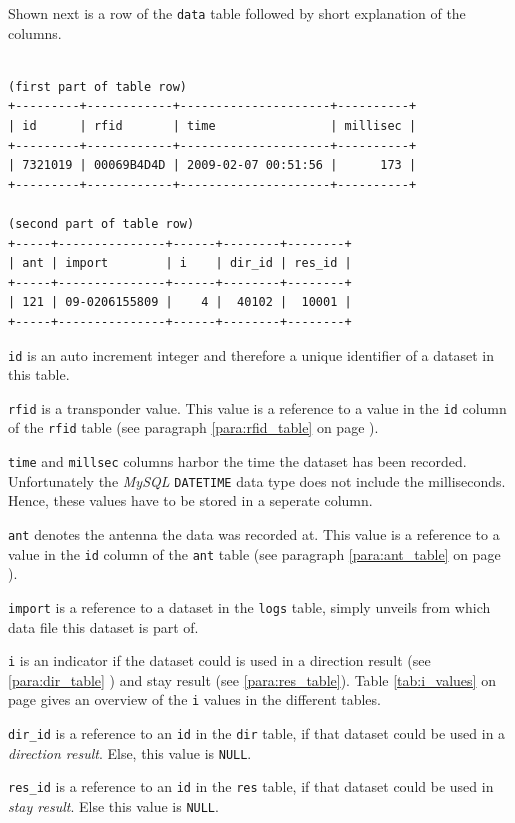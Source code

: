 Shown next is a row of the \lstinline|data| table followed by short explanation of the columns.

\codescript
\begin{lstlisting}[frame=none]

(first part of table row)
+---------+------------+---------------------+----------+
| id      | rfid       | time                | millisec |
+---------+------------+---------------------+----------+
| 7321019 | 00069B4D4D | 2009-02-07 00:51:56 |      173 |
+---------+------------+---------------------+----------+

(second part of table row)
+-----+---------------+------+--------+--------+
| ant | import        | i    | dir_id | res_id |
+-----+---------------+------+--------+--------+
| 121 | 09-0206155809 |    4 |  40102 |  10001 |
+-----+---------------+------+--------+--------+

\end{lstlisting}

\begin{mydesc}
  \item \lstinline|id| is an auto increment integer and therefore a unique identifier of a dataset in this table.
  \item \lstinline|rfid| is a transponder value. This value is a reference to a value in the \lstinline|id| column of the \lstinline|rfid| table (see paragraph \ref{para:rfid_table} on page \pageref{para:rfid_table}).
  \item \lstinline|time| and \lstinline|millsec| columns harbor the time the dataset has been recorded. Unfortunately the \textit{MySQL} \lstinline|DATETIME| data type does not include the milliseconds. Hence, these values have to be stored in a seperate column.
  \item \lstinline|ant| denotes the antenna the data was recorded at. This value is a reference to a value in the \lstinline|id| column of the \lstinline|ant| table (see paragraph \ref{para:ant_table} on page \pageref{para:ant_table}).
  \item \lstinline|import| is a reference to a dataset in the \lstinline|logs| table, simply unveils from which data file this dataset is part of.
  \item \lstinline|i| is an indicator if the dataset could is used in a direction result (see \ref{para:dir_table} ) and stay result (see \ref{para:res_table}). Table \ref{tab:i_values} on page \pageref{tab:i_values} gives an overview of the \lstinline|i| values in the different tables.
  \item \lstinline|dir_id| is a reference to an \lstinline|id| in the \lstinline|dir| table, if that dataset could be used in a \textit{direction result}. Else, this value is \lstinline|NULL|.
  \item \lstinline|res_id| is a reference to an \lstinline|id| in the \lstinline|res| table, if that dataset could be used in \textit{stay result}. Else this value is \lstinline|NULL|.
\end{mydesc}

